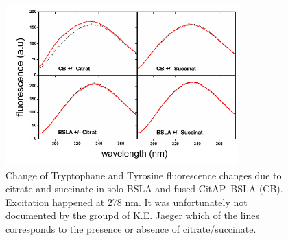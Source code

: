 \documentclass[english, a4paper, 12pt, titlepage, draft]{article}
\begin{document}
\begin{figure}
    \centering
    \includegraphics[width=0.8\textwidth]{figures/TyrTrp/TyrTrp_experiment.pdf}
    \caption{Change of Tryptophane and Tyrosine fluorescence changes due to citrate and succinate in solo BSLA and fused CitAP--BSLA (CB).
        Excitation happened at 278 nm.
        It was unfortunately not documented by the groupd of K.E. Jaeger which of the lines corresponds to the presence or absence of citrate/succinate.}
    \label{fig:TyrTrp_fluorescence}
\end{figure}        
\end{document}
